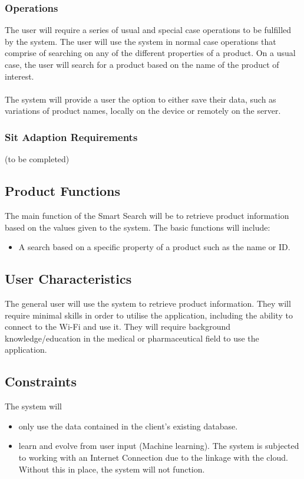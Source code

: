 \documentclass[a4paper,10pt]{article}
\begin{document}
            \subsubsection{Operations}

            	{The user will require a series of usual and special case operations to be fulfilled by the system. The user will use the system in normal case operations that comprise of searching on any of the different properties of a product. On a usual case, the user will search for a product based on the name of the product of interest.\\\\
            	The system will provide a user the option to either save their data, such as variations of product names, locally on the device or remotely on the server.}
		
           \subsubsection{Sit Adaption Requirements}
        (to be completed)
		\subsection{Product Functions} {The main function of the Smart Search will be to retrieve product information based on the values given to the system. The basic functions will include:  }
	\begin{itemize}
  		\item A search based on a specific property of a product such as the name or ID.
	\end{itemize}
	
    	\subsection{User Characteristics}  

{The general user will use the system to retrieve product information. They will require minimal skills in order to utilise the application, including the ability to connect to the Wi-Fi and use it. They will require background knowledge/education in the medical or pharmaceutical field to use the application.\\}

    	\subsection{Constraints}
	The system will
	\begin{itemize}
		\item only use the data contained in the client's existing database.
		\item learn and evolve from user input (Machine learning).
	The system is subjected to working with an Internet Connection due to the linkage with the cloud. Without this in place, the system will not function.	
		
	\end{itemize}
	
\end{document}
